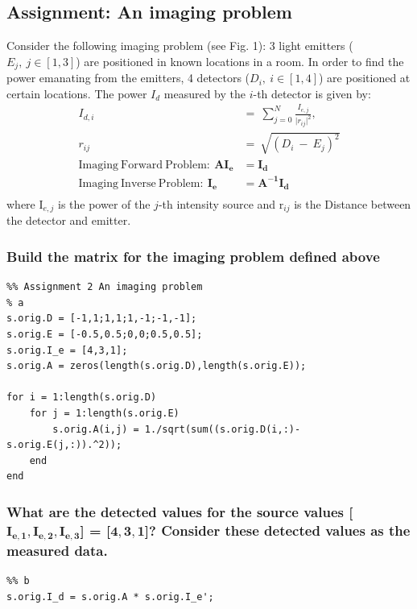 \subsection{Assignment: An imaging problem}
Consider the following imaging problem (see Fig. 1): 3 light emitters ($E_j,\ j\in [1,3]$) are
positioned in known locations in a room. In order to find the power emanating from the
emitters, 4 detectors ($D_i,\ i\in[1,4]$) are positioned at certain locations. The power $I_d$ measured by the $i$-th detector is given by:
\begin{align}
    I_{d,i}\ &=\ \sum_{j=0}^{N}\frac{I_{e,j}}{\mathopen|r_{ij}\mathclose|^2},\\
    r_{ij}\ &=\ \sqrt{(D_i\ -\ E_j)^2}\\
    \mathrm{Imaging\ Forward\ Problem: }\ \mathbf{A I_e} &= \mathbf{I_d}\\
    \mathrm{Imaging\ Inverse\ Problem: }\ \mathbf{I_e} &= \mathbf{A^{-1} I_d}\\  
\end{align}
where I$_{e,j}$ is the power of the $j$-th intensity source and r$_{ij}$ is the Distance between the detector and emitter.



\subsubsection{Build the matrix for the imaging problem defined above}
\begin{lstlisting}
%% Assignment 2 An imaging problem
% a
s.orig.D = [-1,1;1,1;1,-1;-1,-1];
s.orig.E = [-0.5,0.5;0,0;0.5,0.5];
s.orig.I_e = [4,3,1];
s.orig.A = zeros(length(s.orig.D),length(s.orig.E));

for i = 1:length(s.orig.D)
    for j = 1:length(s.orig.E)
        s.orig.A(i,j) = 1./sqrt(sum((s.orig.D(i,:)-s.orig.E(j,:)).^2));
    end
end
\end{lstlisting}




\subsubsection{What are the detected values for the source values [$\mathbf{I_{e,1}, I_{e,2}, I_{e,3}}$] = [$\mathbf{4, 3, 1}$]?
Consider these detected values as the measured data.}
\begin{lstlisting}
%% b
s.orig.I_d = s.orig.A * s.orig.I_e';
\end{lstlisting}

